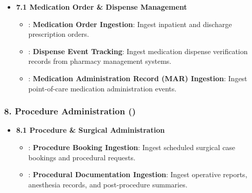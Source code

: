 \begin{itemize}

\item 
\textbf{7.1 Medication Order \& Dispense Management}


\begin{itemize}

\item 
\texttt{}: \textbf{Medication Order Ingestion}: Ingest inpatient and discharge prescription orders.



\item 
\texttt{}: \textbf{Dispense Event Tracking}: Ingest medication dispense verification records from pharmacy management systems.



\item 
\texttt{}: \textbf{Medication Administration Record (MAR) Ingestion}: Ingest point-of-care medication administration events.



\end{itemize}


\end{itemize}
\label{rad:enabling:322}
\subsubsection*{8. Procedure Administration (\texttt{})}
\label{rad:enabling:323}

\begin{itemize}

\item 
\textbf{8.1 Procedure \& Surgical Administration}


\begin{itemize}

\item 
\texttt{}: \textbf{Procedure Booking Ingestion}: Ingest scheduled surgical case bookings and procedural requests.



\item 
\texttt{}: \textbf{Procedural Documentation Ingestion}: Ingest operative reports, anesthesia records, and post-procedure summaries.



\end{itemize}


\end{itemize}
\label{rad:enabling:327}
